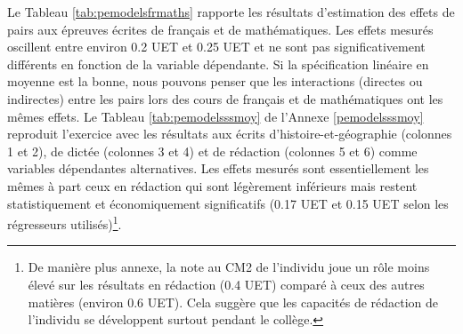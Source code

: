 \documentclass[
]{book}
\begin{document}
\quad Le Tableau \ref{tab:pemodelsfrmaths} rapporte les résultats d'estimation des effets de pairs aux épreuves écrites de français et de mathématiques. Les effets mesurés oscillent entre environ 0.2 UET et 0.25 UET et ne sont pas significativement différents en fonction de la variable dépendante. Si la spécification linéaire en moyenne est la bonne, nous pouvons penser que les interactions (directes ou indirectes) entre les pairs lors des cours de français et de mathématiques ont les mêmes effets. Le Tableau \ref{tab:pemodelsssmoy} de l'Annexe \ref{pemodelsssmoy} reproduit l'exercice avec les résultats aux écrits d'histoire-et-géographie (colonnes 1 et 2), de dictée (colonnes 3 et 4) et de rédaction (colonnes 5 et 6) comme variables dépendantes alternatives. Les effets mesurés sont essentiellement les mêmes à part ceux en rédaction qui sont légèrement inférieurs mais restent statistiquement et économiquement significatifs (0.17 UET et 0.15 UET selon les régresseurs utilisés)\footnote{De manière plus annexe, la note au CM2 de l'individu joue un rôle moins élevé sur les résultats en rédaction (0.4 UET) comparé à ceux des autres matières (environ 0.6 UET). Cela suggère que les capacités de rédaction de l'individu se développent surtout pendant le collège.}.

\newpage
\begingroup\fontsize{8}{10}\selectfont
\end{document}
